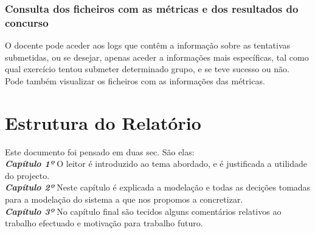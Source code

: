 \subsubsection{Consulta dos ficheiros com as métricas e dos resultados do concurso}
O docente pode aceder aos logs que contêm a informação sobre as tentativas submetidas, ou se desejar, apenas aceder a informações mais específicas, tal como 
qual exercício tentou submeter determinado grupo, e se teve sucesso ou não.\\
Pode também visualizar os ficheiros com as informações das métricas.

\section{Estrutura do Relatório}
Este documento foi pensado em duas sec. São elas:\\

\textbf{\textit{Capítulo 1º}} O leitor é introduzido ao tema abordado, e é justificada a utilidade do projecto.\\

\textbf{\textit{Capítulo 2º}} Neste capítulo é explicada a modelação e todas as decições tomadas para a modelação do sistema a que nos propomos a concretizar.\\

\textbf{\textit{Capítulo 3º}} No capítulo final são tecidos alguns comentários relativos ao trabalho efectuado e motivação para trabalho futuro.\\
